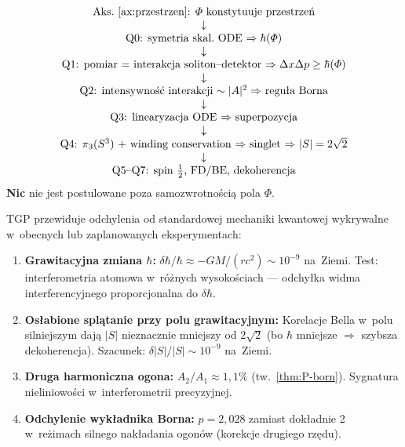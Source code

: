 \begin{remark}\label{rem:P-summary}
\begin{equation*}
  \begin{array}{c}
    \text{Aks.~\ref{ax:przestrzen}: $\Phi$ konstytuuje przestrzeń} \\
    \downarrow \\
    \text{Q0: symetria skal.\ ODE $\Rightarrow \hbar(\Phi)$} \\
    \downarrow \\
    \text{Q1: pomiar = interakcja soliton--detektor $\Rightarrow \Delta x\Delta p \geq \hbar(\Phi)$} \\
    \downarrow \\
    \text{Q2: intensywność interakcji $\sim |A|^2 \Rightarrow$ reguła Borna} \\
    \downarrow \\
    \text{Q3: linearyzacja ODE $\Rightarrow$ superpozycja} \\
    \downarrow \\
    \text{Q4: $\pi_3(S^3)$ + winding conservation $\Rightarrow$ singlet $\Rightarrow$
           $|S| = 2\sqrt{2}$} \\
    \downarrow \\
    \text{Q5--Q7: spin~$\tfrac{1}{2}$, FD/BE, dekoherencja}
  \end{array}
\end{equation*}
\textbf{Nic} nie jest postulowane poza samozwrotnością pola $\Phi$.
\end{remark}

\begin{hypothesis}%
\label{hyp:P-predictions}
TGP przewiduje odchylenia od standardowej mechaniki kwantowej
wykrywalne w~obecnych lub zaplanowanych eksperymentach:
\begin{enumerate}[nosep]
  \item \textbf{Grawitacyjna zmiana $\hbar$:}
        $\delta\hbar/\hbar \approx -GM/(rc^2) \sim 10^{-9}$
        na~Ziemi. Test: interferometria atomowa w~różnych wysokościach
        --- odchyłka widma interferencyjnego proporcjonalna
        do $\delta\hbar$.
  \item \textbf{Osłabione splątanie przy polu grawitacyjnym:}
        Korelacje Bella w~polu silniejszym dają $|S|$ nieznacznie
        mniejszy od $2\sqrt{2}$ (bo $\hbar$ mniejsze
        $\Rightarrow$ szybsza dekoherencja).
        Szacunek: $\delta|S|/|S| \sim 10^{-9}$ na~Ziemi.
  \item \textbf{Druga harmoniczna ogona:}
        $A_2/A_1 \approx 1{,}1\%$ (tw.~\ref{thm:P-born}).
        Sygnatura nieliniowości w~interferometrii precyzyjnej.
  \item \textbf{Odchylenie wykładnika Borna:}
        $p = 2{,}028$ zamiast dokładnie 2 w~reżimach silnego
        nakładania ogonów (korekcje drugiego rzędu).
\end{enumerate}
\end{hypothesis}

